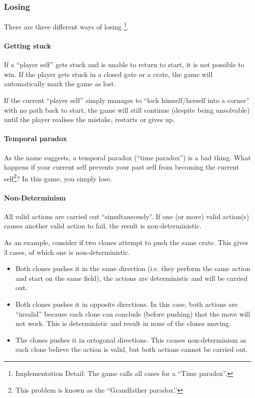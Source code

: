 
\subsubsection{Losing}

There are three different ways of losing
\footnote{Implementation Detail: The game calls all cases for a ``Time paradox''.}.

\paragraph{Getting stuck}
If a ``player self'' gets stuck and is unable to return to start, it
is not possible to win.  If the player gets stuck in a closed gate or
a crate, the game will automatically mark the game as lost.

If the current ``player self'' simply manages to ``lock
himself/herself into a corner'' with no path back to start, the game
will still continue (despite being unsolvable) until the player realises
the mistake, restarts or gives up.

\paragraph{Temporal paradox}
\label{temporal-paradox}
As the name suggests, a temporal paradox (``time paradox'') is a bad
thing.  What happens if your current self prevents your past self from
becoming the current self\footnote{This problem is known as the
  ``Grandfather paradox'.'}?  In this game, you simply lose.

\paragraph{Non-Determinism}
All valid actions are carried out ``simultaneously''.  If one (or
more) valid action(s) causes another valid action to fail, the result
is non-deterministic.

As an example, consider if two clones attempt to push the same
crate.  This gives 3 cases, of which one is non-deterministic.

\begin{itemize}
\item Both clones pushes it in the same direction (i.e. they perform
  the same action and start on the same field), the actions are
  deterministic and will be carried out.
\item Both clones pushes it in opposite directions.  In this case,
  both actions are ``invalid'' because each clone can conclude (before
  pushing) that the move will not work.  This is deterministic and
  result in none of the clones moving.
\item The clones pushes it in ortogonal directions.  This causes
  non-determinism as each clone believe the action is valid, but
  both actions cannot be carried out.
\end{itemize}

